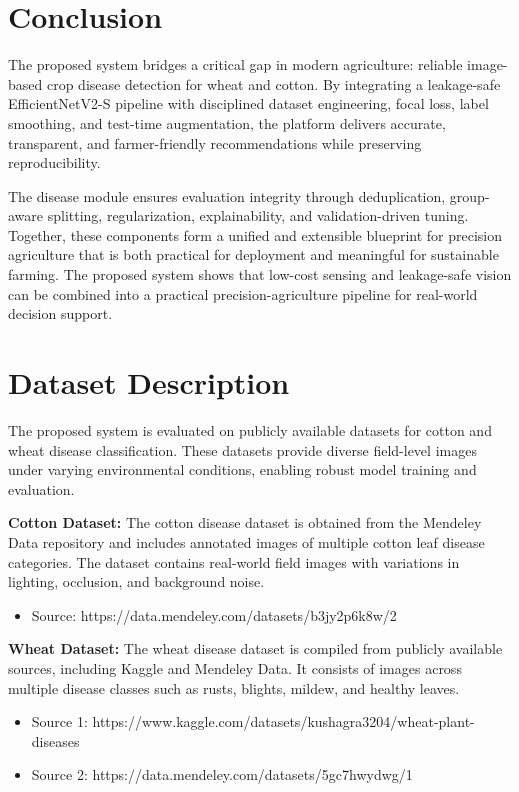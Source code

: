 \documentclass[12pt,a4paper]{report}
\begin{document}
\section{Conclusion}
The proposed system bridges a critical gap in modern agriculture: reliable image-based crop disease detection for wheat and cotton. By integrating a leakage-safe EfficientNetV2-S pipeline with disciplined dataset engineering, focal loss, label smoothing, and test-time augmentation, the platform delivers accurate, transparent, and farmer-friendly recommendations while preserving reproducibility.

The disease module ensures evaluation integrity through deduplication, group-aware splitting, regularization, explainability, and validation-driven tuning. Together, these components form a unified and extensible blueprint for precision agriculture that is both practical for deployment and meaningful for sustainable farming. The proposed system shows that low-cost sensing and leakage-safe vision can be combined into a practical precision-agriculture pipeline for real-world decision support.

\section{Dataset Description}

The proposed system is evaluated on publicly available datasets for cotton and wheat disease classification. These datasets provide diverse field-level images under varying environmental conditions, enabling robust model training and evaluation.

\textbf{Cotton Dataset:} The cotton disease dataset is obtained from the Mendeley Data repository and includes annotated images of multiple cotton leaf disease categories. The dataset contains real-world field images with variations in lighting, occlusion, and background noise.

\begin{itemize}
\item Source: https://data.mendeley.com/datasets/b3jy2p6k8w/2
\end{itemize}

\textbf{Wheat Dataset:} The wheat disease dataset is compiled from publicly available sources, including Kaggle and Mendeley Data. It consists of images across multiple disease classes such as rusts, blights, mildew, and healthy leaves.

\begin{itemize}
\item Source 1: https://www.kaggle.com/datasets/kushagra3204/wheat-plant-diseases
\item Source 2: https://data.mendeley.com/datasets/5gc7hwydwg/1
\end{itemize}
\end{document}
